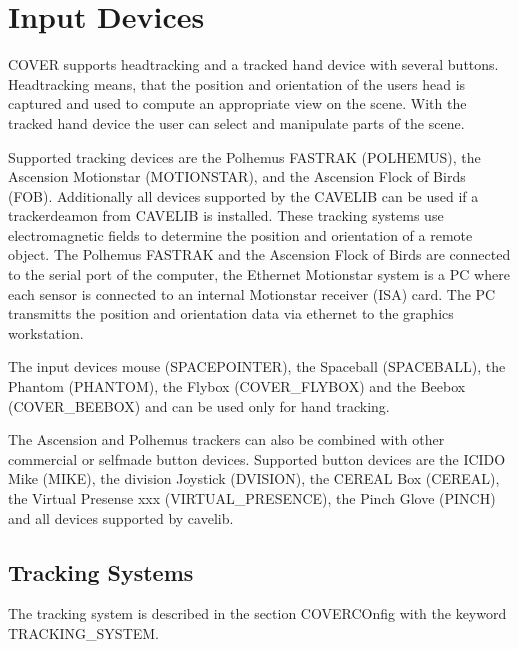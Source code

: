 \begin{htmlonly}

\end{htmlonly}



\startdocument

\chapter{Input Devices}
\label{label_chapter_input}
COVER supports headtracking and a tracked hand device with several buttons.
Headtracking means, that the position and orientation of the users head is
captured and used to compute an appropriate view on the scene. With the
tracked hand device the user can select and manipulate parts of the scene.

Supported tracking devices are the Polhemus FASTRAK (POLHEMUS), the 
Ascension Motionstar (MOTIONSTAR),
and the Ascension Flock of Birds (FOB). Additionally all devices supported by the
CAVELIB can be used if a trackerdeamon from CAVELIB is installed.
These tracking systems use electromagnetic
fields to determine the position and orientation of a remote object. 
The Polhemus FASTRAK and the Ascension Flock of Birds are connected to 
the serial port of the computer, the Ethernet Motionstar system is a PC
where each sensor is connected to an internal Motionstar receiver (ISA) card. The PC transmitts
the position and orientation data via ethernet to the graphics workstation.

The input devices mouse (SPACEPOINTER), the Spaceball (SPACEBALL), the Phantom (PHANTOM), 
the Flybox (COVER\_FLYBOX) and the Beebox (COVER\_BEEBOX) and 
can be used only for hand tracking.

The Ascension and Polhemus trackers can also be combined with other commercial or
selfmade button devices. Supported button devices are the ICIDO Mike (MIKE), the
division Joystick (DVISION), the CEREAL Box (CEREAL), the Virtual Presense  xxx 
(VIRTUAL\_PRESENCE), the Pinch Glove (PINCH) and all devices supported by cavelib.


\section{Tracking Systems}
The tracking system is described in the section COVERCOnfig with the keyword
TRACKING\_SYSTEM.

